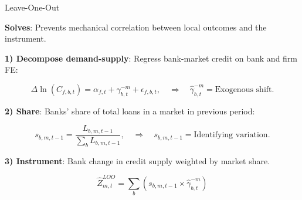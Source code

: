 \documentclass[aspectratio=169]{beamer}
\begin{document}

\begin{frame}[noframenumbering]{Leave-One-Out} \label{loo}

\textbf{Solves}: Prevents mechanical correlation between local outcomes and the instrument.

\vspace{5mm}

\textbf{1) Decompose demand-supply}: Regress bank-market credit on bank and firm FE:

\begin{equation*}
    \Delta \ln(C_{f,b,t}) = \alpha_{f,t} + \gamma_{b,t}^{-m} + \epsilon_{f,b,t}, \quad \Rightarrow \quad \hat{\gamma}_{b,t}^{-m} = \text{Exogenous shift.} 
\end{equation*}

\textbf{2) Share}: Banks' share of total loans in a market in previous period:

\begin{equation*}
    s_{b,m,t-1} = \frac{L_{b,m,t-1}}{\sum_b L_{b,m,t-1}}, \quad \Rightarrow \quad s_{b,m,t-1} = \text{Identifying variation.} 
\end{equation*}

\textbf{3) Instrument}: Bank change in credit supply weighted by market share. 

\begin{equation*}
    \hat{Z}_{m,t}^{LOO} = \sum_b \left( s_{b,m,t-1} \times \hat{\gamma}_{b,t}^{-m} \right) 
\end{equation*}

\hyperlink{iv_market_level}{}

\end{frame}

\end{document}
